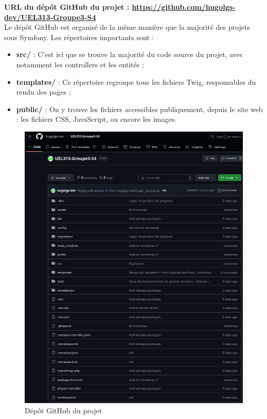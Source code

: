 \documentclass[12pt,a4paper]{article}
\begin{document}
		 \textbf{URL du dépôt GitHub du projet : \url{https://github.com/hugolgs-dev/UEL313-Groupe3-S4}} \\
		 
		 
		 Le dépôt GitHub est organisé de la même manière que la majorité des projets sous Symfony. Les répertoires importants sont :\\
		 
		 \begin{itemize}
		 	\item \textbf{src/} : C'est ici que se trouve la majorité du code source du projet, avec notamment les controllers et les entités ; 
		 	\item \textbf{templates/} : Ce répertoire regroupe tous les fichiers Twig, responsables du rendu des pages ; 
		 	\item \textbf{public/} : On y trouve les fichiers accessibles publiquement, depuis le site web : les fichiers CSS, JavaScript, ou encore les images. \\
		 \end{itemize} 
		 
		 
\begin{figure}[!h]
	\begin{center}
		\includegraphics[scale=.6]{../images/depot.png}
		\caption{Dépôt GitHub du projet}
	\end{center}
\end{figure}	
			
\end{document}

